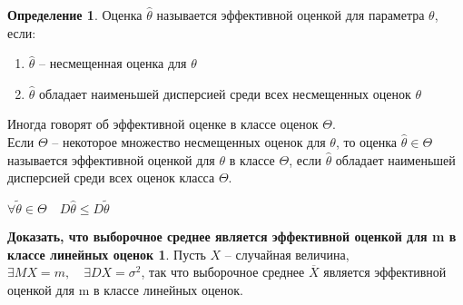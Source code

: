 \documentclass[a4paper, 12pt]{article}
\theoremstyle{definition}
\newtheorem{definition}{Определение}[section]
\theoremstyle{leads}
\theoremstyle{example}
\begin{document}
\begin{definition}
	Оценка $\hat{\theta}$ называется эффективной оценкой для параметра $\theta$, если: 
	\begin{enumerate}
		\item $\hat{\theta}$ -- несмещенная оценка для $\theta$
		\item $\hat{\theta}$ обладает наименьшей дисперсией среди всех несмещенных оценок $\theta$
	\end{enumerate}
\end{definition}
\begin{remark}
	Иногда говорят об эффективной оценке в классе оценок $\Theta$.\\
	Если $\Theta$ -- некоторое множество несмещенных оценок для $\theta$, то оценка $\hat \theta \in \Theta$ называется эффективной оценкой для $\theta$ в классе $\Theta$, если $\hat{\theta}$ обладает наименьшей дисперсией среди всех оценок класса $\Theta$.
	\begin{center}
		$\forall \tilde{\theta} \in \Theta \quad D \hat{\theta} \leq D \tilde{\theta}$
	\end{center}
\end{remark}
\newtheorem*{linear}{Доказать, что выборочное среднее является эффективной оценкой для m в классе линейных оценок}
\begin{linear}
Пусть $X$ -- случайная величина, $\exists MX = m, \quad \exists DX = \sigma^2$, так что выборочное среднее $\overline{X}$ является эффективной оценкой для m в классе линейных оценок.
\end{linear}
\end{document}
